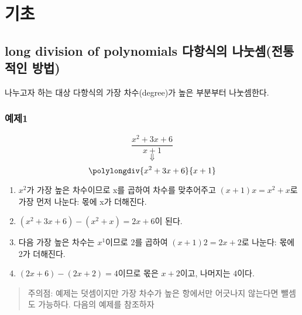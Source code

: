 \documentclass{article}
\begin{document}
\section {기초}

\subsection {long division of polynomials 다항식의 나눗셈(전통적인 방법)}
나누고자 하는 대상 다항식의 가장 차수(degree)가 높은 부분부터 나눗셈한다.
\subsubsection{예제1}
$$\frac{x^{2}+3x+6}{x+1}$$
$$\Downarrow$$
$$\polylongdiv{x^{2}+3x+6}{x+1}$$
\begin {enumerate}
\item $x^{2}$가 가장 높은 차수이므로 x를 곱하여 차수를 맞추어주고 $(x+1)x = x^{2}+x$로 가장 먼저 나눈다: 몫에 x가 더해진다.
\item $(x^{2}+3x+6)-(x^{2}+x)=2x+6$이 된다.
\item 다음 가장 높은 차수는 $x^{1}$이므로 2를 곱하여 $(x+1)2 = 2x+2$로 나눈다: 몫에 2가 더해진다.
\item $(2x+6)-(2x+2) = 4$이므로 몫은 $x+2$이고, 나머지는 $4$이다.
\end {enumerate}
\begin{quote}
주의점: 예제는 덧셈이지만 가장 차수가 높은 항에서만 어긋나지 않는다면 뺄셈도 가능하다. 다음의 예제를 참조하자
\end{quote}
\end{document}
